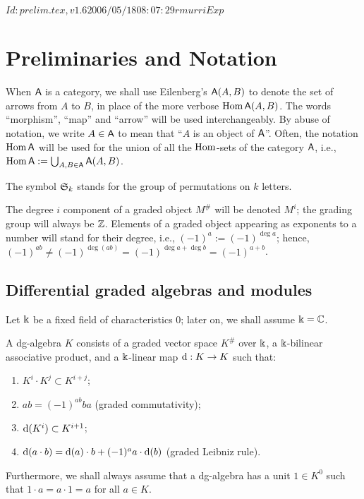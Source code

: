 \RCSID $Id: prelim.tex,v 1.6 2006/05/18 08:07:29 rmurri Exp $


\chapter{Preliminaries and Notation}

When $\mathsf{A}$ is a category, we shall use Eilenberg's $\mathsf{A}(A, B)$ to denote
the set of arrows from $A$ to $B$, in place of the more verbose $\operatorname{Hom}
\mathsf{A}(A, B)$.  The words ``morphism'', ``map'' and ``arrow'' will be used
interchangeably.  By abuse of notation, we write $A \in \mathsf{A}$ to mean that
``$A$ is an object of $\mathsf{A}$''. Often, the notation $\operatorname{Hom}\mathsf{A}$ will be
used for the union of all the $\operatorname{Hom}$-sets of the category $\mathsf{A}$, i.e.,
$\operatorname{Hom}\mathsf{A} := \bigcup_{A,B \in \mathsf{A}} \mathsf{A}(A,B)$.

The symbol $\mathfrak{S}_{k}$ stands for the group of permutations on $k$
letters.

The degree $i$ component of a graded object $M^\#$ will be denoted
$M^i$; the grading group will always be $\mathbb{Z}$. Elements of a graded
object appearing as exponents to a number will stand for their degree,
i.e., $(-1)^a := (-1)^{\deg a}$; hence, $(-1)^{ab} \not=
(-1)^{\deg (ab)} = (-1)^{\deg a + \deg b} = (-1)^{a+b}$.


\section{Differential graded algebras and modules}
\label{sec:dg-things}

Let $\Bbbk$ be a fixed field of characteristics $0$; later on, we shall
assume $\Bbbk = \mathbb{C}$.
\begin{definition}
  A dg-algebra $K$ consists of a graded vector space $K^\#$ over $\Bbbk$,
  a $\Bbbk$-bilinear associative product, and a $\Bbbk$-linear map $\mathrm{d}:
  K\to K$ such that:
  \begin{enumerate}
  \item $K^i \cdot K^j \subset K^{i+j}$;
  \item $ab = (-1)^{ab} ba$ (graded commutativity);
  \item $\mathrm{d}(K^i) \subset K^{i+1}$;
  \item $\mathrm{d}(a\cdot b) = \mathrm{d}(a)\cdot b + (-1)^a a\cdot\mathrm{d}(b)$ (graded Leibniz rule).
  \end{enumerate}
  Furthermore, we shall always assume that a dg-algebra has a unit
  $1\in K^0$ such that $1\cdot a = a\cdot 1 = a$ for all $a\in
  K$.
\end{definition}

